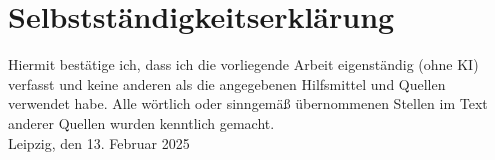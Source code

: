 \section{Selbstständigkeitserklärung}
Hiermit bestätige ich, dass ich die vorliegende Arbeit eigenständig (ohne KI) verfasst und
keine anderen als die angegebenen Hilfsmittel und Quellen verwendet habe.
Alle wörtlich oder sinngemäß übernommenen Stellen im Text anderer Quellen wurden
kenntlich gemacht.\\

Leipzig, den 13. Februar 2025

